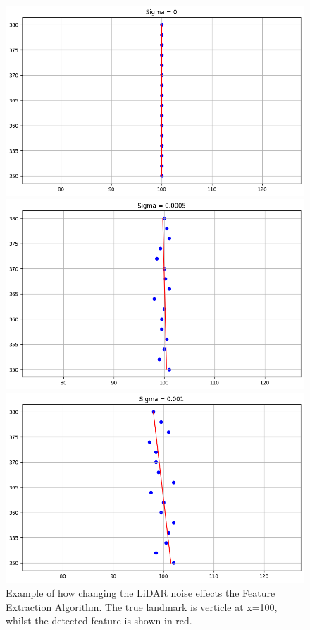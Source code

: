 \documentclass[12pt]{article}
\begin{document}
\begin{figure}[H]
    \centering
    \begin{minipage}{0.3\textwidth}
        \centering
        \includegraphics[width=\linewidth]{plot1}
    \end{minipage}
    \begin{minipage}{0.3\textwidth}
        \centering
        \includegraphics[width=\linewidth]{plot2}
    \end{minipage}
    \begin{minipage}{0.3\textwidth}
        \centering
        \includegraphics[width=\linewidth]{plot3}
    \end{minipage}
    \caption[Short caption]{Example of how changing the LiDAR noise effects the Feature Extraction Algorithm.
    The true landmark is verticle at x=100, whilst the detected feature is shown in red.}
    \label{fig:lidar_noise}
\end{figure}
\end{document}

